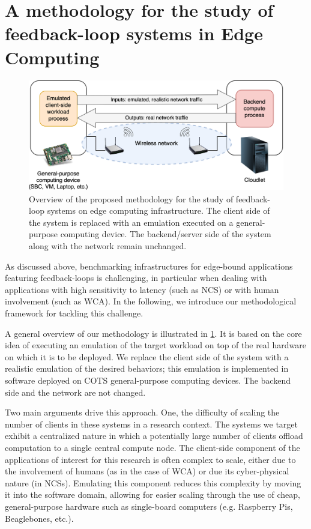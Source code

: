 \section{A methodology for the study of feedback-loop systems in Edge Computing}\label{summary:methodology}


\begin{figure}
    \centering
    \includegraphics[width=.8\textwidth]{Figs/methodology.png}
    \caption{%
        Overview of the proposed methodology for the study of feedback-loop systems on edge computing infrastructure.
        The  client side of the system is replaced with an emulation executed on a general-purpose computing device.
        The backend/server side of the system along with the network remain unchanged.
    }\label{fig:methodology}
\end{figure}

As discussed above, benchmarking infrastructures for edge-bound applications featuring feedback-loops is challenging, in particular when dealing with applications with high sensitivity to latency (such as \gls{NCS}) or with human involvement (such as \gls{WCA}).
In the following, we introduce our methodological framework for tackling this challenge.

A general overview of our methodology is illustrated in \cref{fig:methodology}.
It is based on the core idea of executing an emulation of the target workload on top of the real hardware on which it is to be deployed.
We replace the client side of the system with a realistic emulation of the desired behaviors; this emulation is implemented in software deployed on \gls{COTS} general-purpose computing devices.
The backend side and the network are not changed.

Two main arguments drive this approach.
One, the difficulty of scaling the number of clients in these systems in a research context.
The systems we target exhibit a centralized nature in which a potentially large number of clients offload computation to a single central compute node.
The client-side component of the applications of interest for this research is often complex to scale, either due to the involvement of humans (as in the case of \gls{WCA}) or due its cyber-physical nature (in \glspl{NCS}).
Emulating this component reduces this complexity by moving it into the software domain, allowing for easier scaling through the use of cheap, general-purpose hardware such as single-board computers (e.g. Raspberry Pis, Beaglebones, etc.).


